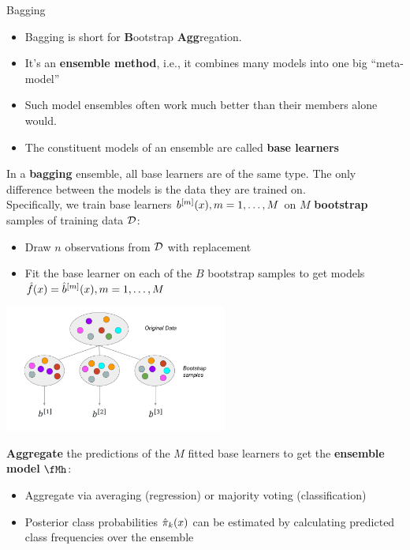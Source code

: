 \documentclass[11pt,compress,t,notes=noshow, xcolor=table]{beamer}
\begin{document}
\begin{vbframe}{Bagging}

\begin{itemize}
  \item Bagging is short for \textbf{B}ootstrap \textbf{Agg}regation.
  \item It's an \textbf{ensemble method}, i.e., it combines many models into one 
        big \enquote{meta-model}
  \item Such model ensembles often work much better than their members alone would.
  \item The constituent models of an ensemble are called \textbf{base learners} 
\end{itemize}

\framebreak 
In a \textbf{bagging} ensemble, all base learners are of the same type. The only difference between the models is the data they are trained on.\\
Specifically, we train base learners $b^{[m]}(x), m = 1, \dots, M$ on $M$ \textbf{bootstrap} samples of training data $\mathcal{D}$:
\begin{itemize}
  \item Draw $n$ observations from $\mathcal{D}$ with replacement
  \item Fit the base learner on each of the $B$ bootstrap samples to get models $\hat{f}(x) = \hat{b}^{[m]}(x), m = 1, \dots, M$
\end{itemize}

\begin{center}
\includegraphics[width=0.55\textwidth]{figure_man/bagging.pdf}
\end{center}

\framebreak

\textbf{Aggregate} the predictions of the $M$ fitted base learners to get the
\textbf{ensemble model} $\fMh$:
  \begin{itemize}
    \item Aggregate via averaging (regression) or majority voting (classification)
    \item Posterior class probabilities $\hat \pi_k(x)$ can be estimated by calculating predicted class frequencies over the ensemble
  \end{itemize}


\end{vbframe}
\end{document}
